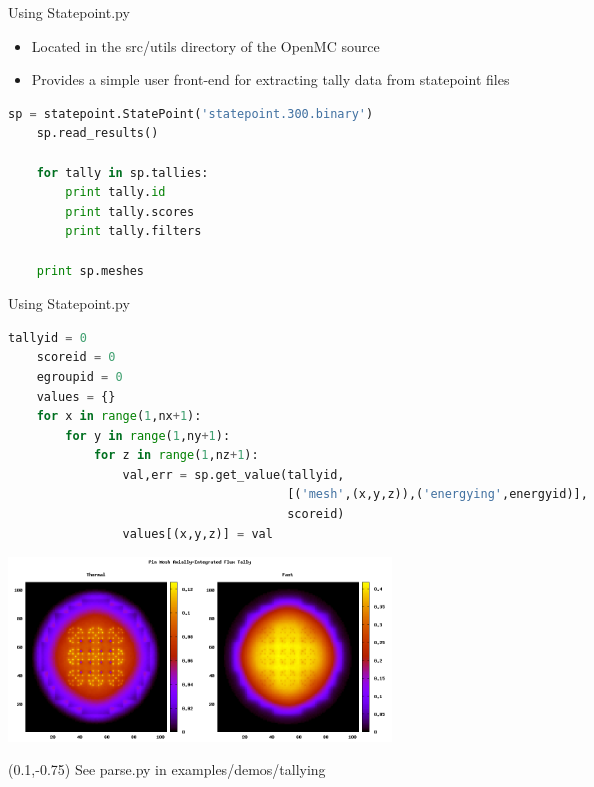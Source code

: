 \documentclass[serif]{beamer}
\begin{document}

\begin{frame}[fragile]{Using Statepoint.py}

  \begin{itemize}
    \item Located in the src/utils directory of the OpenMC source
    \item Provides a simple user front-end for extracting tally data from
    statepoint files
  \end{itemize}

  \begin{scriptsize}
    \begin{lstlisting}[language=Python,backgroundcolor=\color{gray!20},frame=single]
    sp = statepoint.StatePoint('statepoint.300.binary')
    sp.read_results()
    
    for tally in sp.tallies:
        print tally.id
        print tally.scores
        print tally.filters

    print sp.meshes
    \end{lstlisting}
  \end{scriptsize}

\end{frame}


\begin{frame}[fragile]{Using Statepoint.py}

  \begingroup
    \fontsize{5pt}{5.8pt}\selectfont
    \begin{lstlisting}[language=Python,backgroundcolor=\color{gray!20},frame=single]
    tallyid = 0
    scoreid = 0
    egroupid = 0
    values = {}
    for x in range(1,nx+1):
        for y in range(1,ny+1):
            for z in range(1,nz+1):
                val,err = sp.get_value(tallyid,
                                       [('mesh',(x,y,z)),('energying',energyid)],
                                       scoreid)
                values[(x,y,z)] = val
    \end{lstlisting}
  \endgroup
      
  \centering
  
  \includegraphics[width=4in]{src/fluxplot.png}

  \setlength{\TPHorizModule}{\framewidth}
  \setlength{\TPVertModule}{\paperheight}
  \begin{textblock}{1}(0.1,-0.75)
    See parse.py in examples/demos/tallying
  \end{textblock}

\end{frame}
\end{document}
